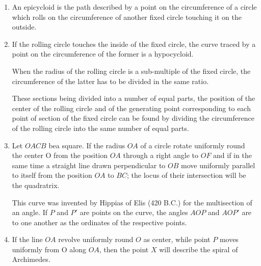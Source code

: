 \begin{enumerate}

\item An epicycloid is the path described by a point on the circumference of a
    circle which rolls on the circumference of another fixed circle touching it
    on the outside.


\item If the rolling circle touches the inside of the fixed circle, the curve
    traced by a point on the circumference of the former is a hypocycloid.

    When the radius of the rolling circle is a sub-multiple of the fixed circle,
    the circumference of the latter has to be divided in the same ratio.

    These sections being divided into a number of equal parts, the position of
    the center of the rolling circle and of the generating point corresponding
    to each point of section of the fixed circle can be found by dividing the
    circumference of the rolling circle into the same number of equal parts.



\item Let $OACB$ bea square. If the radius $OA$ of a circle rotate uniformly
    round the center O from the position $OA$ through a right angle to $OF$ and
    if in the same time a straight line drawn perpendicular to $OB$ move
    uniformly parallel to itself from the position $OA$ to $BC$; the locus of
    their intersection will be the quadratrix.

    This curve was invented by Hippias of Elis (420 B.C.) for the multisection
    of an angle.  If $P$ and $P'$ are points on the curve, the angles $AOP$ and
    $AOP'$ are to one another as the ordinates of the respective points.



\item If the line $OA$ revolve uniformly round $O$ as center, while point $P$
    moves uniformly from O along $OA$, then the point $X$ will describe the
    spiral of Archimedes.


\end{enumerate}

